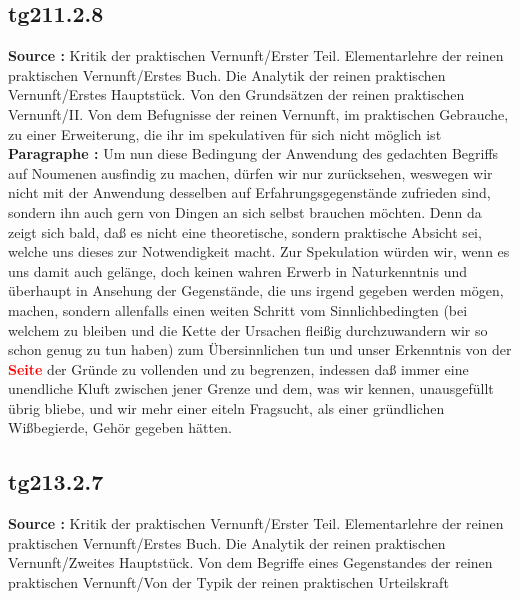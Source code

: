 \documentclass[a4paper,12pt,twoside]{book}
\newcommand{\match}[1]{\textcolor{red}{\textbf{#1}}}
\begin{document}
	\subsection*{tg211.2.8} 
	\textbf{Source : }Kritik der praktischen Vernunft/Erster Teil. Elementarlehre der reinen praktischen Vernunft/Erstes Buch. Die Analytik der reinen praktischen Vernunft/Erstes Hauptstück. Von den Grundsätzen der reinen praktischen Vernunft/II. Von dem Befugnisse der reinen Vernunft, im praktischen Gebrauche, zu einer Erweiterung, die ihr im spekulativen für sich nicht möglich ist\\  
	
	\noindent\textbf{Paragraphe : }Um nun diese Bedingung der Anwendung des gedachten Begriffs auf Noumenen ausfindig zu machen, dürfen wir nur zurücksehen, weswegen wir nicht mit der Anwendung desselben auf Erfahrungsgegenstände zufrieden sind, sondern ihn auch gern von Dingen an sich selbst brauchen möchten. Denn da zeigt sich bald, daß es nicht eine theoretische, sondern praktische Absicht sei, welche  uns dieses zur Notwendigkeit macht. Zur Spekulation würden wir, wenn es uns damit auch gelänge, doch keinen wahren Erwerb in Naturkenntnis und überhaupt in Ansehung der Gegenstände, die uns irgend gegeben werden mögen, machen, sondern allenfalls einen weiten Schritt vom Sinnlichbedingten (bei welchem zu bleiben und die Kette der Ursachen fleißig durchzuwandern wir so schon genug zu tun haben) zum Übersinnlichen tun und unser Erkenntnis von der \match{Seite} der Gründe zu vollenden und zu begrenzen, indessen daß immer eine unendliche Kluft zwischen jener Grenze und dem, was wir kennen, unausgefüllt übrig bliebe, und wir mehr einer eiteln Fragsucht, als einer gründlichen Wißbegierde, Gehör gegeben hätten. 
	
	\subsection*{tg213.2.7} 
	\textbf{Source : }Kritik der praktischen Vernunft/Erster Teil. Elementarlehre der reinen praktischen Vernunft/Erstes Buch. Die Analytik der reinen praktischen Vernunft/Zweites Hauptstück. Von dem Begriffe eines Gegenstandes der reinen praktischen Vernunft/Von der Typik der reinen praktischen Urteilskraft\\  
	
\end{document}
